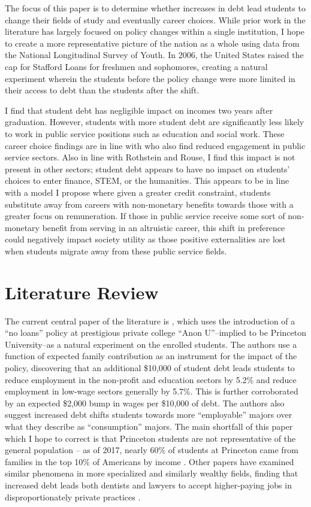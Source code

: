 \documentclass{article}
\begin{document}
	The focus of this paper is to determine whether increases in debt lead students to change their fields of study and eventually career choices. While prior work in the literature has largely focused on policy changes within a single institution, I hope to create a more representative picture of the nation as a whole using data from the National Longitudinal Survey of Youth. In 2006, the United States raised the cap for Stafford Loans for freshmen and sophomores, creating a natural experiment wherein the students before the policy change were more limited in their access to debt than the students after the shift.
	
	I find that student debt has negligible impact on incomes two years after graduation. However, students with more student debt are significantly less likely to work in public service positions such as education and social work. These career choice findings are in line with \textcite{rothstein2011} who also find reduced engagement in public service sectors. Also in line with Rothstein and Rouse, I find this impact is not present in other sectors; student debt appears to have no impact on students' choices to enter finance, STEM, or the humanities. This appears to be in line with a model I propose where given a greater credit constraint, students substitute away from careers with non-monetary benefits towards those with a greater focus on remuneration. If those in public service receive some sort of non-monetary benefit from serving in an altruistic career, this shift in preference could negatively impact society utility as those positive externalities are lost when students migrate away from these public service fields.
	
	\section{Literature Review}
	
	The current central paper of the literature is \textcite{rothstein2011}, which uses the introduction of a ``no loans'' policy at prestigious private college ``Anon U''--implied to be Princeton University--as a natural experiment on the enrolled students. The authors use a function of expected family contribution as an instrument for the impact of the policy, discovering that an additional \$10,000 of student debt leads students to reduce employment in the non-profit and education sectors by 5.2\% and reduce employment in low-wage sectors generally by 5.7\%. This is further corroborated by an expected \$2,000 bump in wages per \$10,000 of debt. The authors also suggest increased debt shifts students towards more ``employable'' majors over what they describe as ``consumption'' majors. The main shortfall of this paper which I hope to correct is that Princeton students are not representative of the general population -- as of 2017, nearly 60\% of students at Princeton came from families in the top 10\% of Americans by income \parencite{aisch2017}. Other papers have examined similar phenomena in more specialized and similarly wealthy fields, finding that increased debt leads both dentists and lawyers to accept higher-paying jobs in disproportionately private practices \parencite{nicholson2015, field2009}.
	
\end{document}
